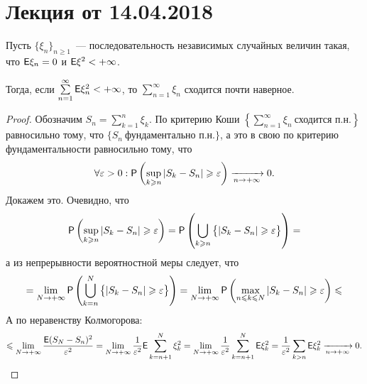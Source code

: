 \section{Лекция от 14.04.2018}
\begin{theorem}
	Пусть $\{\xi_n \}_{n \geqslant 1}$~--- последовательность независимых случайных величин такая, что $\E \xi_n = 0 $ и $\E \xi^2 < +\infty$. 
	
	Тогда, если $\sum\limits_{n = 1}^{\infty} \E \xi_n^2 < +\infty$, то $ \sum\limits_{n = 1}^{\infty} \xi_n$ сходится почти наверное.
	\begin{proof}
		Обозначим $S_n = \sum\limits_{k=1}^n \xi_k$. По критерию Коши $\left\{ \sum\limits_{n = 1}^{\infty}\xi_n~\text{сходится п.н.} \right\}$ равносильно тому, что $\{ S_n~\text{фундаментально п.н.}\}$, а это в свою по критерию фундаментальности равносильно тому, что 
		$$\forall \varepsilon > 0: \P \left( \sup\limits_{k \geqslant n} | S_k - S_n | \geqslant \varepsilon \right) \limn 0.$$ Докажем это.
		 Очевидно, что
		 $$\P \left( \sup\limits_{k \geqslant n} | S_k - S_n | \geqslant \varepsilon \right) = \P \left( \bigcup\limits_{k \geqslant n} \big\{| S_k - S_n | \geqslant \varepsilon \big\} \right) =$$
		 а из непрерывности вероятностной меры следует, что 
		 $$= \lim\limits_{N \rightarrow +\infty} \P \left( \bigcup\limits_{k = n}^{N} \big\{| S_k - S_n | \geqslant \varepsilon \big\} \right) = \lim\limits_{N \rightarrow +\infty} \P \left( \max\limits_{n \leqslant k \leqslant N} | S_k - S_n | \geqslant \varepsilon \right) \leqslant$$
		 А по неравенству Колмогорова:
		 $$\leqslant \lim\limits_{N \rightarrow + \infty} \dfrac{\E ( S_N - S_n)^2}{\varepsilon^2} = \lim\limits_{N \rightarrow + \infty} \dfrac{1}{\varepsilon^2} \E \sum\limits_{k = n + 1}^N \xi_k^2 = \lim\limits_{N \rightarrow + \infty} \dfrac{1}{\varepsilon^2} \sum\limits_{k = n + 1}^N \E \xi_k^2 = \dfrac{1}{\varepsilon^2} \sum\limits_{k > n} \E \xi_k^2 \limn 0.$$
	\end{proof}
\end{theorem}

